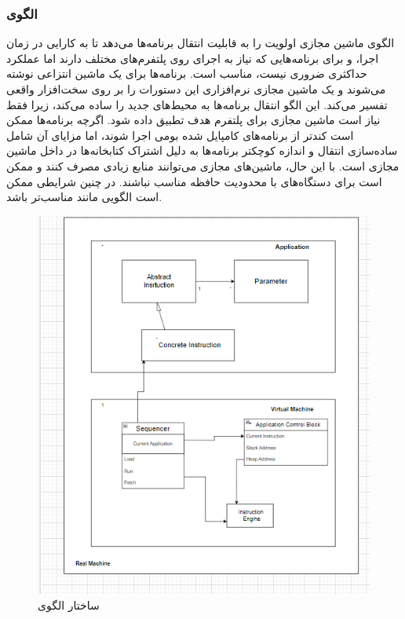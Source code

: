 \subsubsection{الگوی }
\label{archVirtMachineSec}
\begin{RTL}
الگوی ماشین مجازی \cite{ref4} اولویت را
به قابلیت انتقال برنامه‌ها می‌دهد تا به کارایی
در زمان اجرا، و برای برنامه‌هایی که نیاز به اجرای روی پلتفرم‌های مختلف
دارند اما عملکرد حداکثری ضروری نیست، مناسب است.
برنامه‌ها برای یک ماشین انتزاعی نوشته می‌شوند و یک ماشین مجازی
نرم‌افزاری این دستورات را بر روی سخت‌افزار واقعی تفسیر می‌کند.
این الگو انتقال برنامه‌ها به محیط‌های جدید را ساده می‌کند،
زیرا فقط نیاز است ماشین مجازی برای پلتفرم هدف تطبیق داده شود.
اگرچه برنامه‌ها ممکن است کندتر از برنامه‌های کامپایل شده بومی اجرا
شوند، اما مزایای آن شامل ساده‌سازی انتقال و اندازه کوچکتر برنامه‌ها به
دلیل اشتراک کتابخانه‌ها در داخل ماشین مجازی است. با این حال، ماشین‌های
مجازی می‌توانند منابع زیادی مصرف کنند و ممکن است برای دستگاه‌های با
محدودیت حافظه مناسب نباشند. در چنین شرایطی ممکن است الگویی مانند
مناسب‌تر باشد.
\end{RTL}
\begin{figure}[h!]
\centering
\includegraphics[scale=0.8]{images/first/virtual_machine.png}
\caption{ساختار الگوی }
\end{figure}